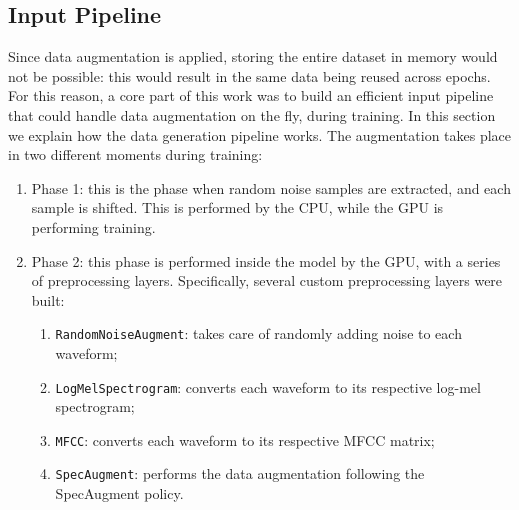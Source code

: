 \subsection{Input Pipeline}
\label{sec:processing_architecture}
Since data augmentation is applied, storing the entire dataset in memory would not be possible: this would result in the same data being reused across epochs. For this reason, a core part of this work was to build an efficient input pipeline that could handle data augmentation on the fly, during training. In this section we explain how the data generation pipeline works. The augmentation takes place in two different moments during training: 
\begin{enumerate}
	\item Phase 1: this is the phase when random noise samples are extracted, and each sample is shifted. This is performed by the CPU, while the GPU is performing training. 
	\item Phase 2: this phase is performed inside the model by the GPU, with a series of preprocessing layers. Specifically, several custom preprocessing layers were built:
	\begin{enumerate}
		\item \verb|RandomNoiseAugment|: takes care of randomly adding noise to each waveform;
		\item \verb|LogMelSpectrogram|: converts each waveform to its respective log-mel spectrogram;
		\item \verb|MFCC|: converts each waveform to its respective MFCC matrix;
		\item \verb|SpecAugment|: performs the data augmentation following the SpecAugment policy.
	\end{enumerate}
\end{enumerate}

